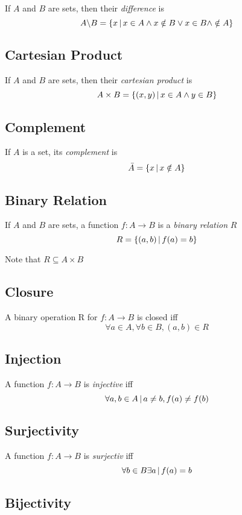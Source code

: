 \documentclass{article}
\begin{document}
If \(A\) and \(B\) are sets, then their \textit{difference} is
\[
    A \backslash B = \{x \,|\, x \in A \land x \notin B \lor x \in B \land \notin A\}
\]

\subsection{Cartesian Product}

If \(A\) and \(B\) are sets, then their \textit{cartesian product} is
\[
    A\times B = \{(x,y) \,|\, x \in A \land y \in B\}
\]

\subsection{Complement}

If \(A\) is a set, its \textit{complement} is
\[
    \bar{A} = \{x \,|\, x \notin A\}
\]

\subsection{Binary Relation}

If \(A\) and \(B\) are sets, a function \(f:A\to B\)
is a \textit{binary relation} \(R\)
\[
    R = \{(a,b) \,|\, f(a)=b\}
\]

Note that \(R\subseteq A\times B\)

\subsection{Closure}

A binary operation R for \(f:A\to B\) is closed iff
\[
    \forall a \in A, \forall b \in B,
    (a,b) \in R
\]

\subsection{Injection}

A function \(f:A\to B\) is \textit{injective} iff
\[
    \forall a,b \in A \,|\, a\neq b, f(a)\neq f(b)
\]

\subsection{Surjectivity}

A function \(f:A\to B\) is \textit{surjectiv} iff
\[
    \forall b \in B \exists a \,|\, f(a)=b
\]

\subsection{Bijectivity}
\end{document}
